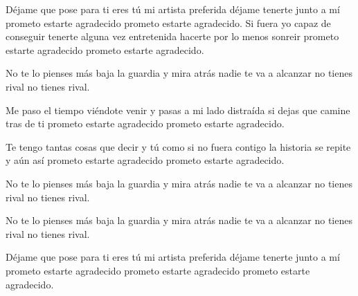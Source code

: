 
Déjame que pose para ti
eres tú mi artista preferida
déjame tenerte junto a mí
prometo estarte agradecido
prometo estarte agradecido.
Si fuera yo capaz de conseguir
tenerte alguna vez entretenida
hacerte por lo menos sonreir
prometo estarte agradecido
prometo estarte agradecido.

No te lo pienses más
baja la guardia y mira atrás
nadie te va a alcanzar
no tienes rival
no tienes rival.

Me paso el tiempo viéndote venir
y pasas a mi lado distraída
si dejas que camine tras de ti
prometo estarte agradecido
prometo estarte agradecido.

Te tengo tantas cosas que decir
y tú como si no fuera contigo
la historia se repite y aún así
prometo estarte agradecido
prometo estarte agradecido.

No te lo pienses más
baja la guardia y mira atrás
nadie te va a alcanzar
no tienes rival
no tienes rival.

No te lo pienses más
baja la guardia y mira atrás
nadie te va a alcanzar
no tienes rival
no tienes rival.

Déjame que pose para ti
eres tú mi artista preferida
déjame tenerte junto a mí
prometo estarte agradecido
prometo estarte agradecido
prometo estarte agradecido.

 